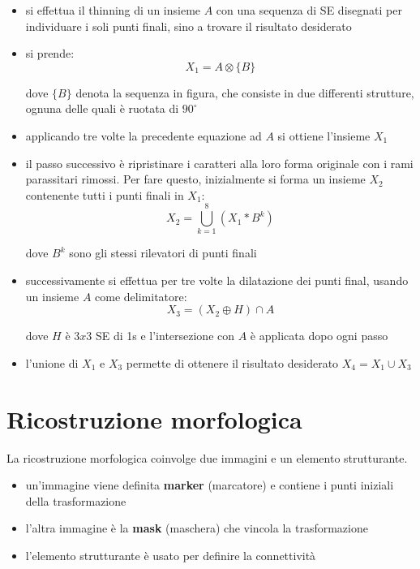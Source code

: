 \begin{itemize}
	\item si effettua il thinning di un insieme $A$ con una sequenza di SE disegnati per individuare i soli punti finali, sino a trovare il risultato desiderato
	
	\item si prende:
	$$
	X_1 = A \otimes \{ B \}
	$$
	
	dove $\{B\}$ denota la sequenza in figura, che consiste in due differenti strutture, ognuna delle quali è ruotata di $90^ \circ$
	
	\item applicando tre volte la precedente equazione ad $A$ si ottiene l'insieme $X_1$
	
	\item il passo successivo è ripristinare i caratteri alla loro forma originale con i rami parassitari rimossi. Per fare questo, inizialmente si forma un insieme $X_2$ contenente tutti i punti finali in $X_1$:
	$$
	X_2 = \bigcup_{k = 1}^{8} (X_1 * B^k)
	$$
	
	dove $B^k$ sono gli stessi rilevatori di punti finali 
	
	\item successivamente si effettua per tre volte la dilatazione dei punti final, usando un insieme $A$ come delimitatore:
	$$
	X_3 = (X_2 \oplus H) \cap A
	$$
	
	dove $H$ è $3x3$ SE di 1s e l'intersezione con $A$ è applicata dopo ogni passo
	
	\item l'unione di $X_1$ e $X_3$ permette di ottenere il risultato desiderato $X_4 = X_1 \cup X_3$
\end{itemize}

\section{Ricostruzione morfologica}
La ricostruzione morfologica coinvolge due immagini e un elemento strutturante.
\begin{itemize}
	\item un'immagine viene definita \textbf{marker} (marcatore) e contiene i punti iniziali della trasformazione
	
	\item l'altra immagine è la \textbf{mask} (maschera) che vincola la trasformazione
	
	\item l'elemento strutturante è usato per definire la connettività
\end{itemize}

